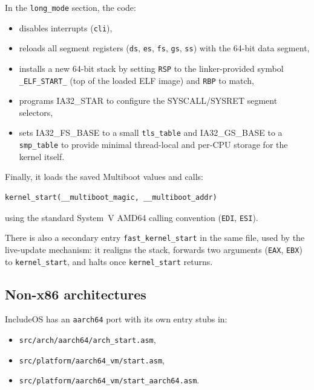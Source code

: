 \documentclass[a4paper,11pt]{article}
\begin{document}
In the \texttt{long\_mode} section, the code:

\begin{itemize}
  \item disables interrupts (\texttt{cli}),
  \item reloads all segment registers (\texttt{ds}, \texttt{es},
        \texttt{fs}, \texttt{gs}, \texttt{ss}) with the 64-bit data
        segment,
  \item installs a new 64-bit stack by setting \texttt{RSP} to the
        linker-provided symbol \texttt{\_ELF\_START\_} (top of the loaded
        ELF image) and \texttt{RBP} to match,
  \item programs IA32\_STAR to configure the SYSCALL/SYSRET segment
        selectors,
  \item sets IA32\_FS\_BASE to a small \texttt{tls\_table} and
        IA32\_GS\_BASE to a \texttt{smp\_table} to provide minimal
        thread-local and per-CPU storage for the kernel itself.
\end{itemize}

Finally, it loads the saved Multiboot values and calls:

\begin{verbatim}
kernel_start(__multiboot_magic, __multiboot_addr)
\end{verbatim}

using the standard System~V AMD64 calling convention (\texttt{EDI},
\texttt{ESI}).

There is also a secondary entry \texttt{fast\_kernel\_start} in the same
file, used by the live-update mechanism: it realigns the stack, forwards
two arguments (\texttt{EAX}, \texttt{EBX}) to \texttt{kernel\_start}, and
halts once \texttt{kernel\_start} returns.

\subsection{Non-x86 architectures}

IncludeOS has an \texttt{aarch64} port with its own entry stubs in:

\begin{itemize}
  \item \texttt{src/arch/aarch64/arch\_start.asm},
  \item \texttt{src/platform/aarch64\_vm/start.asm},
  \item \texttt{src/platform/aarch64\_vm/start\_aarch64.asm}.
\end{itemize}
\end{document}
